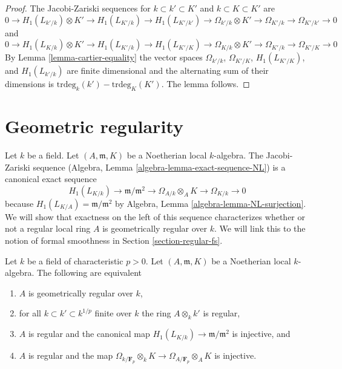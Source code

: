 \begin{proof}
The Jacobi-Zariski sequences for $k \subset k' \subset K'$ and
$k \subset K \subset K'$ are
$$
0 \to H_1(L_{k'/k}) \otimes K'  \to
H_1(L_{K'/k}) \to
H_1(L_{K'/k'}) \to
\Omega_{k'/k} \otimes K' \to
\Omega_{K'/k} \to
\Omega_{K'/k'} \to 0
$$
and
$$
0 \to H_1(L_{K/k}) \otimes K' \to
H_1(L_{K'/k}) \to
H_1(L_{K'/K}) \to
\Omega_{K/k} \otimes K' \to
\Omega_{K'/k} \to
\Omega_{K'/K} \to 0
$$
By
Lemma \ref{lemma-cartier-equality}
the vector spaces $\Omega_{k'/k}$, $\Omega_{K'/K}$, $H_1(L_{K'/K})$, and
$H_1(L_{k'/k})$ are finite dimensional and the alternating sum of their
dimensions is $\text{trdeg}_k(k') - \text{trdeg}_K(K')$.
The lemma follows.
\end{proof}





\section{Geometric regularity}
\label{section-geometrically-regular}

\noindent
Let $k$ be a field. Let $(A, \mathfrak m, K)$ be a Noetherian local
$k$-algebra. The Jacobi-Zariski sequence
(Algebra, Lemma \ref{algebra-lemma-exact-sequence-NL})
is a canonical exact sequence
$$
H_1(L_{K/k}) \to \mathfrak m/\mathfrak m^2 \to \Omega_{A/k} \otimes_A K \to
\Omega_{K/k} \to 0
$$
because $H_1(L_{K/A}) = \mathfrak m/\mathfrak m^2$ by
Algebra, Lemma \ref{algebra-lemma-NL-surjection}.
We will show that exactness on the left of this sequence characterizes
whether or not a regular local ring $A$ is geometrically regular over $k$.
We will link this to the notion of formal smoothness in
Section \ref{section-regular-fs}.

\begin{proposition}
\label{proposition-characterization-geometrically-regular}
Let $k$ be a field of characteristic $p > 0$.
Let $(A, \mathfrak m, K)$ be a Noetherian local
$k$-algebra. The following are equivalent
\begin{enumerate}
\item $A$ is geometrically regular over $k$,
\item for all $k \subset k' \subset k^{1/p}$
finite over $k$ the ring $A \otimes_k k'$ is regular,
\item $A$ is regular and the canonical map
$H_1(L_{K/k}) \to \mathfrak m/\mathfrak m^2$ is injective, and
\item $A$ is regular and the map
$\Omega_{k/\mathbf{F}_p} \otimes_k K \to \Omega_{A/\mathbf{F}_p} \otimes_A K$
is injective.
\end{enumerate}
\end{proposition}

